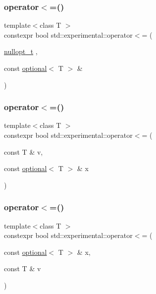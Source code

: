 \subsubsection{\texorpdfstring{operator$<$=()}{operator<=()}\hspace{0.1cm}{\footnotesize\ttfamily [3/9]}}
{\footnotesize\ttfamily template$<$class T $>$ \\
constexpr bool std\+::experimental\+::operator$<$= (\begin{DoxyParamCaption}\item[{\hyperlink{structstd_1_1experimental_1_1nullopt__t}{nullopt\+\_\+t}}]{,  }\item[{const \hyperlink{classstd_1_1experimental_1_1optional}{optional}$<$ T $>$ \&}]{ }\end{DoxyParamCaption})\hspace{0.3cm}{\ttfamily [noexcept]}}

\mbox{\label{namespacestd_1_1experimental_a4482ae3dc6aad99b5d17a3a2c0dfe30f}} 
\subsubsection{\texorpdfstring{operator$<$=()}{operator<=()}\hspace{0.1cm}{\footnotesize\ttfamily [4/9]}}
{\footnotesize\ttfamily template$<$class T $>$ \\
constexpr bool std\+::experimental\+::operator$<$= (\begin{DoxyParamCaption}\item[{const T \&}]{v,  }\item[{const \hyperlink{classstd_1_1experimental_1_1optional}{optional}$<$ T $>$ \&}]{x }\end{DoxyParamCaption})}

\mbox{\label{namespacestd_1_1experimental_a9dd11e02b37f5d3e9c09a29c7ea7024c}} 
\subsubsection{\texorpdfstring{operator$<$=()}{operator<=()}\hspace{0.1cm}{\footnotesize\ttfamily [5/9]}}
{\footnotesize\ttfamily template$<$class T $>$ \\
constexpr bool std\+::experimental\+::operator$<$= (\begin{DoxyParamCaption}\item[{const \hyperlink{classstd_1_1experimental_1_1optional}{optional}$<$ T $>$ \&}]{x,  }\item[{const T \&}]{v }\end{DoxyParamCaption})}

